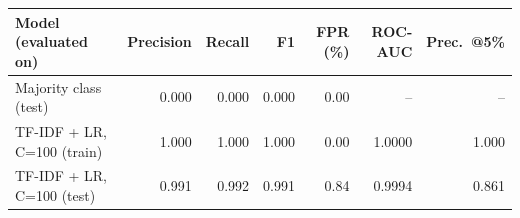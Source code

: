 \begin{tabular}{lrrrrrr}
\toprule
Model (evaluated on) & Precision & Recall & F1 & FPR (\%) & ROC-AUC & Prec.\ @5\% \\
\midrule
Majority class (test) & 0.000 & 0.000 & 0.000 & 0.00 & -- & -- \\
TF-IDF + LR, C=100 (train) & 1.000 & 1.000 & 1.000 & 0.00 & 1.0000 & 1.000 \\
TF-IDF + LR, C=100 (test) & 0.991 & 0.992 & 0.991 & 0.84 & 0.9994 & 0.861 \\
\bottomrule
\end{tabular}